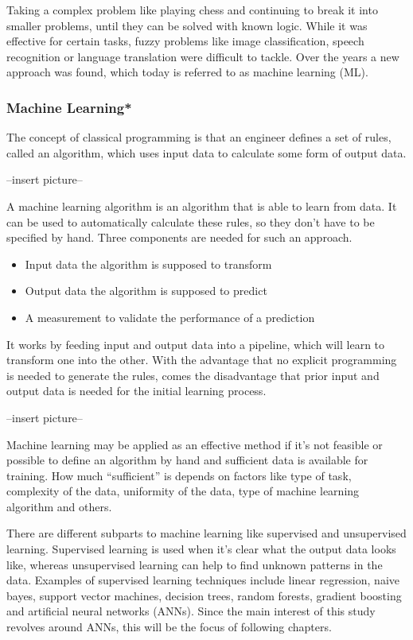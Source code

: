 Taking a complex problem like playing chess and continuing to break it into smaller problems, until they can be solved with known logic. While it was effective for certain tasks, fuzzy problems like image classification, speech recognition or language translation were difficult to tackle. Over the years a new approach was found, which today is referred to as machine learning (ML).

\subsubsection{Machine Learning*}

The concept of classical programming is that an engineer defines a set of rules, called an algorithm, which uses input data to calculate some form of output data\cite{Chollet2017}.

--insert picture--

A machine learning algorithm is an algorithm that is able to learn from data\cite{Goodfellow2016}. It can be used to automatically calculate these rules, so they don't have to be specified by hand. Three components are needed for such an approach.

\begin{itemize}
\item Input data the algorithm is supposed to transform
\item Output data the algorithm is supposed to predict
\item A measurement to validate the performance of a prediction
\end{itemize}

It works by feeding input and output data into a pipeline, which will learn to transform one into the other. With the advantage that no explicit programming is needed to generate the rules, comes the disadvantage that prior input and output data is needed for the initial learning process.

--insert picture--

Machine learning may be applied as an effective method if it's not feasible or possible to define an algorithm by hand and sufficient data is available for training. How much “sufficient” is depends on factors like type of task, complexity of the data, uniformity of the data, type of machine learning algorithm and others.

There are different subparts to machine learning like supervised and unsupervised learning. Supervised learning is used when it's clear what the output data looks like, whereas unsupervised learning can help to find unknown patterns in the data. Examples of supervised learning techniques include linear regression, naive bayes, support vector machines, decision trees, random forests, gradient boosting and artificial neural networks (ANNs). Since the main interest of this study revolves around ANNs, this will be the focus of following chapters.

